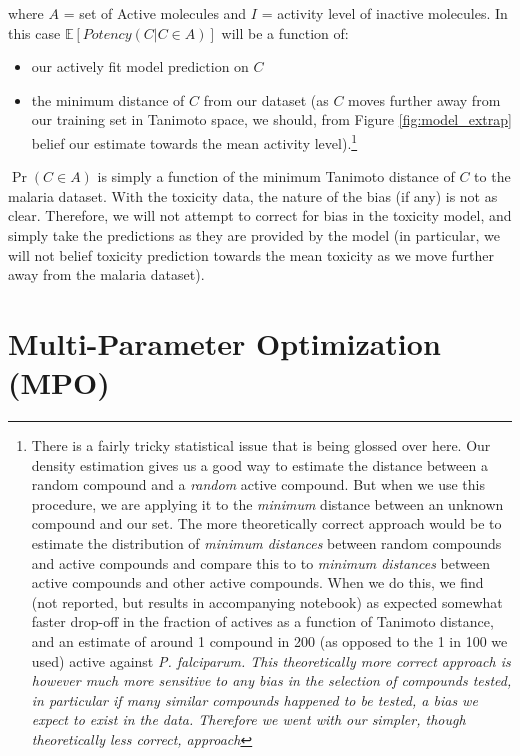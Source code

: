 \documentclass[journal=jacsat,manuscript=article]{achemso}
\begin{document}
where $A$ = set of Active molecules and $I$ = activity level of inactive molecules. In this case $\mathbb{E}[Potency(C | C \in A)]$ will be a function of: \begin{itemize}
    \item our actively fit model prediction on $C$
    \item the minimum distance of $C$ from our dataset (as $C$ moves further away from our training set in Tanimoto space, we should, from Figure \ref{fig:model_extrap} belief our estimate towards the mean activity level).\footnote{There is a fairly tricky statistical issue that is being glossed over here.  Our density estimation gives us a good way to estimate the distance between a random compound and a \textit{random} active compound.  But when we use this procedure, we are applying it to the \textit{minimum} distance between an unknown compound and our set.  The more theoretically correct approach would be to estimate the distribution of \textit{minimum distances} between random compounds and active compounds and compare this to to \textit{minimum distances} between active compounds and other active compounds.  When we do this, we find (not reported, but results in accompanying notebook) as expected somewhat faster drop-off in the fraction of actives as a function of Tanimoto distance, and an estimate of around 1 compound in 200 (as opposed to the 1 in 100 we used) active against \it{P. falciparum}.  This theoretically more correct approach is however much more sensitive to any bias in the selection of compounds tested, in particular if many similar compounds happened to be tested, a bias we expect to exist in the data.  Therefore we went with our simpler, though theoretically less correct, approach}
\end{itemize}

$\Pr(C \in A)$ is simply a function of the minimum Tanimoto distance of $C$ to the malaria dataset.
With the toxicity data, the nature of the bias (if any) is not as clear.  Therefore, we will not attempt to correct for bias in the toxicity model, and simply take the predictions as they are provided by the model (in particular, we will not belief toxicity prediction towards the mean toxicity as we move further away from the malaria dataset).


\section*{Multi-Parameter Optimization (MPO)}
\end{document}
